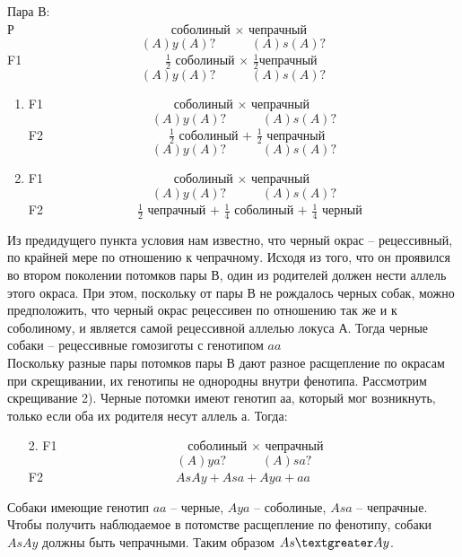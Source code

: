 Пара В:\\
Р$\hspace{150pt}$соболиный $\times$ чепрачный
$$(A)y(A)?\hspace{34pt}(A)s(A)?$$
F1$\hspace{137pt}\frac{1}{2}$ соболиный $\times$ $\frac{1}{2}$чепрачный
$$(A)y(A)?\hspace{34pt}(A)s(A)?$$
\begin{enumerate}
\item F1$\hspace{125pt}$соболиный $\times$ чепрачный
$$(A)y(A)?\hspace{34pt}(A)s(A)?$$
F2$\hspace{120pt}\frac{1}{2}$ соболиный $+$ $\frac{1}{2}$ чепрачный
$$(A)y(A)?\hspace{34pt}(A)s(A)?$$
\item F1$\hspace{125pt}$соболиный $\times$ чепрачный
$$(A)y(A)?\hspace{34pt}(A)s(A)?$$
F2$\hspace{90pt}\frac{1}{2}$ чепрачный $+$ $\frac{1}{4}$ соболиный $+$ $\frac{1}{4}$ черный\\
\end{enumerate}
Из предидущего пункта условия нам известно, что черный окрас – рецессивный, по крайней мере по отношению к чепрачному. Исходя из того, что он проявился во втором поколении потомков пары В, один из родителей должен нести аллель этого окраса. При этом, поскольку от пары В не рождалось черных собак, можно предположить, что черный окрас рецессивен по отношению так же и к соболиному, и является самой рецессивной аллелью локуса А. Тогда черные собаки – рецессивные гомозиготы с генотипом $aa$\\
Поскольку разные пары потомков пары В дают разное расщепление по окрасам при скрещивании, их генотипы не однородны внутри фенотипа. Рассмотрим скрещивание 2). Черные потомки имеют генотип аа, который мог возникнуть, только если оба их родителя несут аллель а. Тогда:\\
\begin{enumerate}
\item [2.] F1$\hspace{125pt}$соболиный $\times$ чепрачный
$$(A)ya?\hspace{34pt}(A)sa?$$
F2$\hspace{127pt}AsAy+Asa+Aya + aa$\\
\end{enumerate}
Собаки имеющие генотип $aa$ – черные, $Aya$ – соболиные, $Asa$ – чепрачные. Чтобы получить наблюдаемое в потомстве расщепление по фенотипу, собаки $AsAy$ должны быть чепрачными. Таким образом $As\textgreater Ay$.\\
